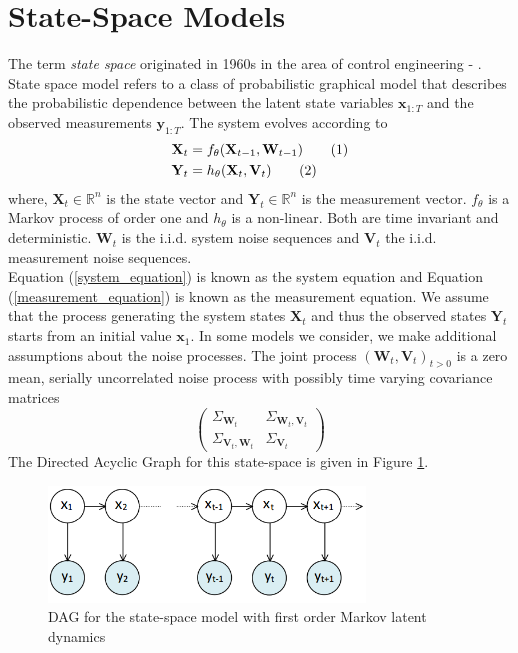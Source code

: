\documentclass[11pt,a4,twosided,singlespacing,titlepagenumber=on]{scrreprt}
\numberwithin{equation}{chapter} %
\theoremstyle{remark}
\newcommand{\matr}[1]{\mathbf{#1}}
\newcommand\numberthis{\addtocounter{equation}{1}\tag{\theequation}}
\begin{document}
\section{State-Space Models}
\label{section:ssm}
The term \textit{state space} originated in 1960s in the area of control engineering - \cite{kalman1960}. State space model refers to a class of probabilistic graphical model that describes the probabilistic dependence between the latent state variables $\matr{x}_{1:T}$ and the observed measurements $\matr{y}_{1:T}$. The system evolves according to
\begin{align*}
\matr{X}_t &= f_\theta(\matr{X}_{t-1},\matr{W}_{t-1}) \numberthis \label{system_equation} \\
\matr{Y}_t &= h_\theta(\matr{X}_t, \matr{V}_t) \numberthis \label{measurement_equation}
\end{align*}
where, $\matr{X}_t \in \mathbb{R}^n$ is the state vector and $\matr{Y}_t \in \mathbb{R}^n$ is the measurement vector. $f_\theta$ is a Markov process of order one and $h_\theta$ is a non-linear. Both are time invariant and deterministic. $\matr{W}_t$ is the i.i.d. system noise sequences and $\matr{V}_t$ the i.i.d. measurement noise sequences. \\

Equation (\ref{system_equation}) is known as the system equation and Equation (\ref{measurement_equation}) is known as the measurement equation. We assume that the process generating the system states $\matr{X}_t$ and thus the observed states $\matr{Y}_t$ starts from an initial value $\matr{x}_1$. In some models we consider, we make additional assumptions about the noise processes. The joint process $(\matr{W}_t, \matr{V}_t)_{t>0}$ is a zero mean, serially uncorrelated noise process with possibly time varying covariance matrices
\begin{equation}
\begin{pmatrix}
\Sigma_{\matr{W}_t} & \Sigma_{\matr{W}_t, \matr{V}_t}\\
\Sigma_{\matr{V}_t, \matr{W}_t} & \Sigma_{\matr{V}_t} \label{corr_ssm}
\end{pmatrix}
\end{equation}
The Directed Acyclic Graph for this state-space is given in Figure \ref{state_space_models}.
\begin{figure}[H]
\centering
\includegraphics[width = 0.75\textwidth]{state_space_models}
\caption{DAG for the state-space model with first order Markov latent dynamics}
\label{state_space_models}
\end{figure}
\end{document}
